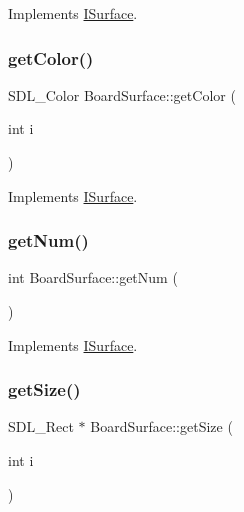 Implements \mbox{\hyperlink{class_i_surface_a45bacb1ffa6f0835e3ece0123b90c4fc}{I\+Surface}}.

\mbox{\label{class_board_surface_aaede8bb86e00ae26f235dd9437ecded7}} 
\subsubsection{\texorpdfstring{get\+Color()}{getColor()}}
{\footnotesize\ttfamily S\+D\+L\+\_\+\+Color Board\+Surface\+::get\+Color (\begin{DoxyParamCaption}\item[{int}]{i }\end{DoxyParamCaption})\hspace{0.3cm}{\ttfamily [virtual]}}



Implements \mbox{\hyperlink{class_i_surface_adf609edb8f871bf37ed9aaf8fe0d2695}{I\+Surface}}.

\mbox{\label{class_board_surface_ae4a6c65ef771b0a4c46fab6297ce0928}} 
\subsubsection{\texorpdfstring{get\+Num()}{getNum()}}
{\footnotesize\ttfamily int Board\+Surface\+::get\+Num (\begin{DoxyParamCaption}{ }\end{DoxyParamCaption})\hspace{0.3cm}{\ttfamily [virtual]}}



Implements \mbox{\hyperlink{class_i_surface_a1553f92deac310771e6fe63d62fc1d95}{I\+Surface}}.

\mbox{\label{class_board_surface_a920508ee01c7ad51b33f4411b0acfba1}} 
\subsubsection{\texorpdfstring{get\+Size()}{getSize()}}
{\footnotesize\ttfamily S\+D\+L\+\_\+\+Rect $\ast$ Board\+Surface\+::get\+Size (\begin{DoxyParamCaption}\item[{int}]{i }\end{DoxyParamCaption})\hspace{0.3cm}{\ttfamily [virtual]}}



